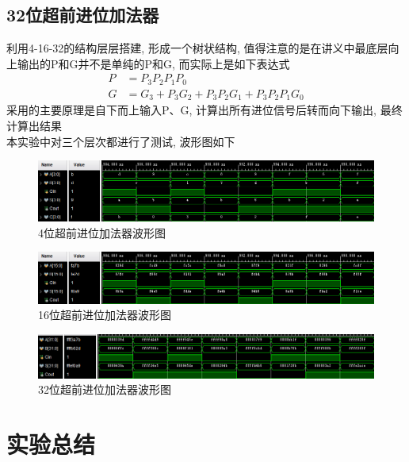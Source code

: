 \documentclass[fontset=windows,12pt]{article}
\begin{document}
    \subsection{32位超前进位加法器}
        利用4-16-32的结构层层搭建, 形成一个树状结构, 值得注意的是在讲义中最底层向上输出的P和G并不是单纯的P和G, 
        而实际上是如下表达式
        \begin{align*}
            P&=P_3P_2P_1P_0\\
            G&=G_3+P_3G_2+P_3P_2G_1+P_3P_2P_1G_0
        \end{align*}
        采用的主要原理是自下而上输入P、G, 计算出所有进位信号后转而向下输出, 最终计算出结果\\
        本实验中对三个层次都进行了测试, 波形图如下
        \begin{figure}[ht]
            \centering
            \includegraphics[width=1\textwidth]{4位超前进位加法器波形图.jpg}
            \caption{4位超前进位加法器波形图}
        \end{figure}\par
        \begin{figure}[ht]
            \centering
            \includegraphics[width=1\textwidth]{16位超前进位加法器.jpg}
            \caption{16位超前进位加法器波形图}
        \end{figure}\par
        \begin{figure}[ht]
            \centering
            \includegraphics[width=1\textwidth]{32位超前进位加法器波形图.jpg}
            \caption{32位超前进位加法器波形图}
        \end{figure}\par


\section{实验总结}
\end{document}
